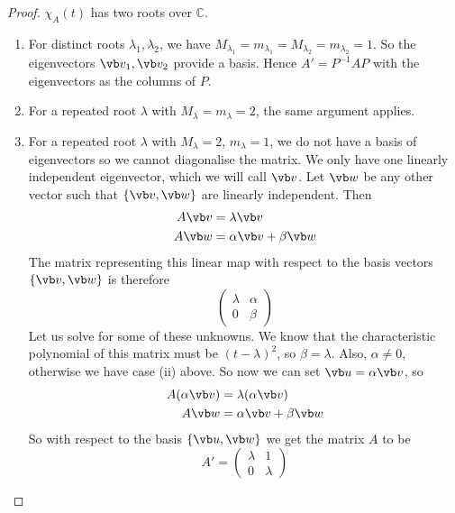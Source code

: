 \begin{proof}
	\(\chi_A(t)\) has two roots over \(\mathbb C\).
	\begin{enumerate}
		\item For distinct roots \(\lambda_1, \lambda_2\), we have \(M_{\lambda_1} = m_{\lambda_1} = M_{\lambda_2} = m_{\lambda_2} = 1\).
		      So the eigenvectors \(\vb v_1, \vb v_2\) provide a basis.
		      Hence \(A' = P^{-1}AP\) with the eigenvectors as the columns of \(P\).
		\item For a repeated root \(\lambda\) with \(M_\lambda = m_\lambda = 2\), the same argument applies.
		\item For a repeated root \(\lambda\) with \(M_\lambda = 2\), \(m_\lambda = 1\), we do not have a basis of eigenvectors so we cannot diagonalise the matrix.
		      We only have one linearly independent eigenvector, which we will call \(\vb v\).
		      Let \(\vb w\) be any other vector such that \(\{ \vb v, \vb w \}\) are linearly independent.
		      Then
		      \begin{align*}
			      A\vb v & = \lambda \vb v              \\
			      A\vb w & = \alpha \vb v + \beta \vb w
		      \end{align*}
		      The matrix representing this linear map with respect to the basis vectors \(\{ \vb v, \vb w \}\) is therefore
		      \[
			      \begin{pmatrix}
				      \lambda & \alpha \\
				      0       & \beta
			      \end{pmatrix}
		      \]
		      Let us solve for some of these unknowns.
		      We know that the characteristic polynomial of this matrix must be \((t - \lambda)^2\), so \(\beta = \lambda\).
		      Also, \(\alpha \neq 0\), otherwise we have case (ii) above.
		      So now we can set \(\vb u = \alpha \vb v\), so
		      \begin{align*}
			      A(\alpha \vb v) & = \lambda (\alpha \vb v)     \\
			      A\vb w          & = \alpha \vb v + \beta \vb w
		      \end{align*}
		      So with respect to the basis \(\{ \vb u, \vb w \}\) we get the matrix \(A\) to be
		      \[
			      A' = \begin{pmatrix}
				      \lambda & 1       \\
				      0       & \lambda
			      \end{pmatrix}
		      \]
	\end{enumerate}
\end{proof}
